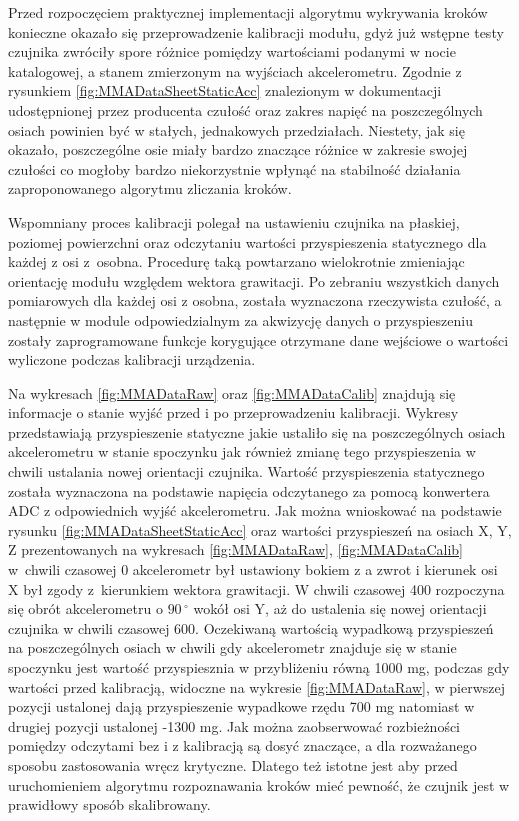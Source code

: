 Przed rozpoczęciem praktycznej implementacji algorytmu wykrywania kroków
konieczne okazało się przeprowadzenie kalibracji modułu, gdyż już wstępne testy
czujnika zwróciły spore różnice pomiędzy wartościami podanymi w nocie
katalogowej, a stanem zmierzonym na wyjściach akcelerometru. Zgodnie z rysunkiem
\ref{fig:MMADataSheetStaticAcc} znalezionym w dokumentacji udostępnionej przez producenta czułość
oraz zakres napięć na poszczególnych osiach powinien być w stałych, jednakowych
przedziałach. Niestety, jak się okazało, poszczególne osie miały bardzo
znaczące różnice w zakresie swojej czułości co mogłoby bardzo niekorzystnie wpłynąć na
stabilność działania zaproponowanego algorytmu zliczania kroków. 

Wspomniany proces kalibracji polegał na ustawieniu czujnika na płaskiej,
poziomej powierzchni oraz odczytaniu wartości przyspieszenia statycznego dla
każdej z osi z~osobna. Procedurę taką powtarzano wielokrotnie zmieniając
orientację modułu względem wektora grawitacji. Po zebraniu wszystkich danych
pomiarowych dla każdej osi z osobna, została wyznaczona rzeczywista czułość, a
następnie w module odpowiedzialnym za akwizycję danych o przyspieszeniu zostały
zaprogramowane funkcje korygujące otrzymane dane wejściowe o wartości wyliczone
podczas kalibracji urządzenia.

Na wykresach \ref{fig:MMADataRaw} oraz \ref{fig:MMADataCalib} znajdują się
informacje o stanie wyjść przed i po przeprowadzeniu kalibracji. Wykresy
przedstawiają przyspieszenie statyczne jakie ustaliło się na poszczególnych
osiach akcelerometru w stanie spoczynku jak również zmianę tego przyspieszenia w
chwili ustalania nowej orientacji czujnika. Wartość przyspieszenia statycznego
została wyznaczona na podstawie napięcia odczytanego za pomocą konwertera ADC z
odpowiednich wyjść akcelerometru. Jak można wnioskować na podstawie rysunku
\ref{fig:MMADataSheetStaticAcc} oraz wartości przyspieszeń na osiach X, Y, Z
prezentowanych na wykresach \ref{fig:MMADataRaw}, \ref{fig:MMADataCalib} w~chwili
czasowej 0 akcelerometr był ustawiony bokiem z a zwrot  i kierunek osi X był
zgody z~kierunkiem wektora grawitacji. W chwili czasowej 400 rozpoczyna się obrót
akcelerometru o $90\,^{\circ}$ wokół osi Y, aż do ustalenia się nowej orientacji
czujnika w chwili czasowej 600. Oczekiwaną wartością wypadkową przyspieszeń na
poszczególnych osiach w chwili gdy akcelerometr znajduje się w stanie spoczynku
jest wartość przyspiesznia w przybliżeniu równą 1000 mg, podczas gdy wartości
przed kalibracją, widoczne na wykresie \ref{fig:MMADataRaw}, w pierwszej pozycji
ustalonej dają przyspieszenie wypadkowe rzędu 700 mg natomiast w drugiej pozycji
ustalonej -1300 mg. Jak można zaobserwować rozbieżności pomiędzy odczytami bez i
z kalibracją są dosyć znaczące, a dla rozważanego sposobu zastosowania wręcz
krytyczne. Dlatego też istotne jest aby przed uruchomieniem algorytmu
rozpoznawania kroków mieć pewność, że czujnik jest w prawidłowy sposób
skalibrowany. \newpage
  
